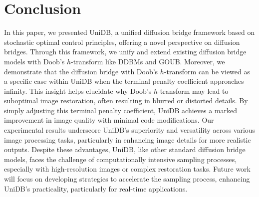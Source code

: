 \section{Conclusion}
In this paper, we presented UniDB, a unified diffusion bridge framework based on stochastic optimal control principles, offering a novel perspective on diffusion bridges. Through this framework, we unify and extend existing diffusion bridge models with Doob's $h$-transform like DDBMs and GOUB. Moreover, we demonstrate that the diffusion bridge with Doob's $h$-transform can be viewed as a specific case within UniDB when the terminal penalty coefficient approaches infinity. This insight helps elucidate why Doob's $h$-transform may lead to suboptimal image restoration, often resulting in blurred or distorted details. By simply adjusting this terminal penalty coefficient, UniDB achieves a marked improvement in image quality with minimal code modifications. Our experimental results underscore UniDB’s superiority and versatility across various image processing tasks, particularly in enhancing image details for more realistic outputs. Despite these advantages, UniDB, like other standard diffusion bridge models, faces the challenge of computationally intensive sampling processes, especially with high-resolution images or complex restoration tasks. Future work will focus on developing strategies to accelerate the sampling process, enhancing UniDB’s practicality, particularly for real-time applications. 

